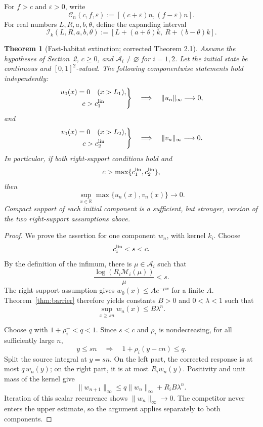 \documentclass[11pt]{article}
\newtheorem{theorem}{Theorem}[section]
\theoremstyle{definition}
\newcommand{\R}{\mathbb R}
\newcommand{\M}{\mathcal M}
\begin{document}
For \(f>c\) and \(\varepsilon>0\), write
\begin{equation}\label{eq:certified-corridor}
  \mathcal C_n(c,f,\varepsilon)
  :=
  [(c+\varepsilon)n,(f-\varepsilon)n].
\end{equation}
For real numbers \(L,R,a,b,\theta\), define the expanding interval
\begin{equation}\label{eq:expanding-interval}
  \mathcal I_k(L,R,a,b,\theta)
  :=
  [L+(a+\theta)k,\ R+(b-\theta)k].
\end{equation}

\begin{theorem}[Fast-habitat extinction; corrected Theorem 2.1]
\label{thm:global-extinction}
Assume the hypotheses of Section~2, \(c\geq0\), and
\(\mathcal A_i\neq\varnothing\) for \(i=1,2\).  Let the initial state be
continuous and \([0,1]^2\)-valued.  The following componentwise statements
hold independently:
\[
  \left.
  \begin{gathered}
    u_0(x)=0\quad(x>L_1),\\
    c>c_1^{\rm lin}
  \end{gathered}
  \right\}
  \quad\Longrightarrow\quad
  \|u_n\|_\infty\longrightarrow0,
\]
and
\[
  \left.
  \begin{gathered}
    v_0(x)=0\quad(x>L_2),\\
    c>c_2^{\rm lin}
  \end{gathered}
  \right\}
  \quad\Longrightarrow\quad
  \|v_n\|_\infty\longrightarrow0.
\]
In particular, if both right-support conditions hold and
\[
  c>\max\{c_1^{\rm lin},c_2^{\rm lin}\},
\]
then
\[
  \sup_{x\in\R}\max\{u_n(x),v_n(x)\}\longrightarrow0.
\]
Compact support of each initial component is a sufficient, but stronger,
version of the two right-support assumptions above.
\end{theorem}

\begin{proof}
We prove the assertion for one component \(w_n\), with kernel \(k_i\).
Choose
\[
  c_i^{\rm lin}<s<c.
\]
By the definition of the infimum, there is
\(\mu\in\mathcal A_i\) such that
\[
  \frac{\log(R_i\M_i(\mu))}{\mu}<s.
\]
The right-support assumption gives
\(w_0(x)\leq Ae^{-\mu x}\) for a finite \(A\).  Theorem~\ref{thm:barrier}
therefore yields constants \(B>0\) and \(0<\lambda<1\) such that
\[
  \sup_{x\geq sn}w_n(x)\leq B\lambda^n.
\]

Choose \(q\) with \(1+\rho_i^-<q<1\).  Since \(s<c\) and \(\rho_i\) is
nondecreasing, for all sufficiently large \(n\),
\[
  y\leq sn
  \quad\Longrightarrow\quad
  1+\rho_i(y-cn)\leq q.
\]
Split the source integral at \(y=sn\).  On the left part, the corrected
response is at most \(q\,w_n(y)\); on the right part, it is at most
\(R_iw_n(y)\).  Positivity and unit mass of the kernel give
\[
  \|w_{n+1}\|_\infty
  \leq q\|w_n\|_\infty+R_iB\lambda^n.
\]
Iteration of this scalar recurrence shows
\(\|w_n\|_\infty\to0\).  The competitor never enters the upper estimate, so
the argument applies separately to both components.
\end{proof}
\end{document}
